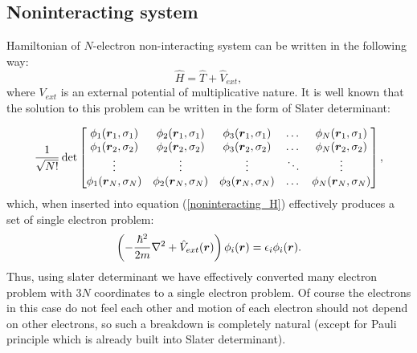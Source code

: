 \documentclass[openany, longbibliography,slovene,a4paper,12pt]{article}
\def\vec#1{\mbox{\boldmath$#1$}}
\begin{document}
\subsection{Noninteracting system}
Hamiltonian of $N$-electron non-interacting system can be written in the
following way:
 \begin{equation} \label{noninteracting_H}
   \hat H =\hat  T + \hat V_{ext}, 
 \end{equation}
 where $V_{ext}$ is an external potential of multiplicative nature. It is well
 known that the solution to this problem can be written in the form of Slater determinant:

 \[
      \frac{1}{\sqrt{N!}}\det 
   \begin{bmatrix}
   \phi_{1}(\vec r_1, \sigma_1) & \phi_{2}(\vec r_1, \sigma_1) & \phi_{3}(\vec
   r_1, \sigma_1) & \dots & \phi_{N}(\vec r_1, \sigma_1) \\
    \phi_{1}(\vec r_2, \sigma_2) & \phi_{2}(\vec r_2, \sigma_2) & \phi_{3}(\vec
    r_2, \sigma_2) & \dots & \phi_{N}(\vec r_2, \sigma_2) \\
    \vdots & \vdots & \vdots & \ddots & \vdots \\
     \phi_{1}(\vec r_N, \sigma_N) & \phi_{2}(\vec r_N, \sigma_N) & \phi_{3}(\vec r_N, \sigma_N) & \dots & \phi_{N}(\vec r_N, \sigma_N) \\
\end{bmatrix},
\]
 which, when inserted into equation (\ref{noninteracting_H}) effectively produces
a set of single electron problem:
 \begin{equation}
   \left(-\frac{\hbar^2}{2m}\nabla^2 + \hat V_{ext}(\vec r)\right) \phi_i (\vec r) = \epsilon_i \phi_i(\vec r).
 \end{equation}
 Thus, using slater determinant we have effectively converted many electron
 problem with $3N$ coordinates to a single electron problem. Of course the
 electrons in this case do not feel each other and motion of each electron
 should not depend on other electrons, so such a breakdown is completely natural
 (except for Pauli principle which is already built into Slater determinant).
 
\end{document}
